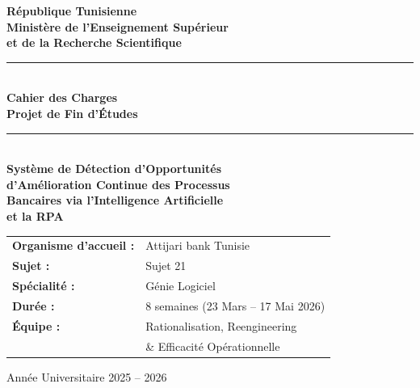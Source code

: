 \documentclass[12pt,a4paper]{report}
\begin{document}
\begin{titlepage}
    \centering
    \vspace*{1cm}
    
    {\large\textbf{République Tunisienne}}\\
    {\large\textbf{Ministère de l'Enseignement Supérieur}}\\[0.3cm]
    {\large\textbf{et de la Recherche Scientifique}}\\[1.5cm]
    
    \rule{\textwidth}{1.5pt}\\[0.4cm]
    {\Huge\bfseries\textcolor{attijariDark}{Cahier des Charges}}\\[0.2cm]
    {\Large\bfseries\textcolor{attijariDark}{Projet de Fin d'Études}}\\[0.3cm]
    \rule{\textwidth}{1.5pt}\\[1cm]
    
    {\LARGE\bfseries\textcolor{attijariOrange}{Système de Détection d'Opportunités}}\\[0.2cm]
    {\LARGE\bfseries\textcolor{attijariOrange}{d'Amélioration Continue des Processus}}\\[0.2cm]
    {\LARGE\bfseries\textcolor{attijariOrange}{Bancaires via l'Intelligence Artificielle}}\\[0.2cm]
    {\LARGE\bfseries\textcolor{attijariOrange}{et la RPA}}\\[1.5cm]
    
    \begin{tabular}{ll}
        \textbf{Organisme d'accueil :} & Attijari bank Tunisie \\[0.2cm]
        \textbf{Sujet :} & Sujet 21 \\[0.2cm]
        \textbf{Spécialité :} & Génie Logiciel \\[0.2cm]
        \textbf{Durée :} & 8 semaines (23 Mars -- 17 Mai 2026) \\[0.2cm]
        \textbf{Équipe :} & Rationalisation, Reengineering \\
        & \& Efficacité Opérationnelle \\
    \end{tabular}
    
    \vfill
    
    {\large\textcolor{attijariGray}{Année Universitaire 2025 -- 2026}}
    
\end{titlepage}
\end{document}
